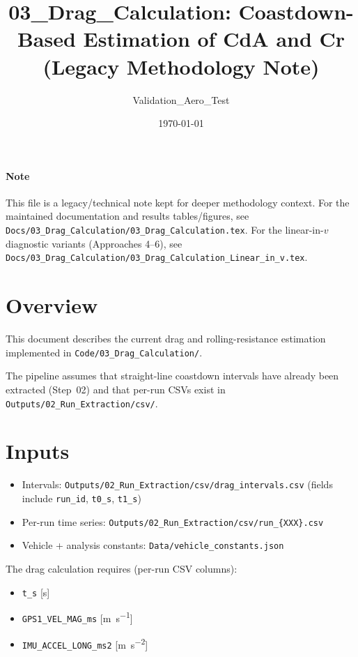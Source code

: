 \documentclass[11pt,a4paper]{article}
\title{03\_Drag\_Calculation: Coastdown-Based Estimation of CdA and Cr (Legacy Methodology Note)}
\author{Validation\_Aero\_Test}
\date{\today}
\begin{document}
\maketitle

\paragraph{Note}
This file is a legacy/technical note kept for deeper methodology context.
For the maintained documentation and results tables/figures, see
  \texttt{Docs/03\_Drag\_Calculation/03\_Drag\_Calculation.tex}.
For the linear-in-\(v\) diagnostic variants (Approaches 4--6), see
  \texttt{Docs/03\_Drag\_Calculation/03\_Drag\_Calculation\_Linear\_in\_v.tex}.

\section{Overview}
This document describes the current drag and rolling-resistance estimation implemented in
	\texttt{Code/03\_Drag\_Calculation/}.

The pipeline assumes that straight-line coastdown intervals have already been extracted (Step~02)
and that per-run CSVs exist in \texttt{Outputs/02\_Run\_Extraction/csv/}.

\section{Inputs}
\begin{itemize}
  \item Intervals: \texttt{Outputs/02\_Run\_Extraction/csv/drag\_intervals.csv} (fields include \texttt{run\_id}, \texttt{t0\_s}, \texttt{t1\_s})
  \item Per-run time series: \texttt{Outputs/02\_Run\_Extraction/csv/run\_\{XXX\}.csv}
  \item Vehicle + analysis constants: \texttt{Data/vehicle\_constants.json}
\end{itemize}

The drag calculation requires (per-run CSV columns):
\begin{itemize}
  \item \texttt{t\_s} [s]
  \item \texttt{GPS1\_VEL\_MAG\_ms} [\si{\meter\per\second}]
  \item \texttt{IMU\_ACCEL\_LONG\_ms2} [\si{\meter\per\second\squared}]
\end{itemize}
\end{document}
